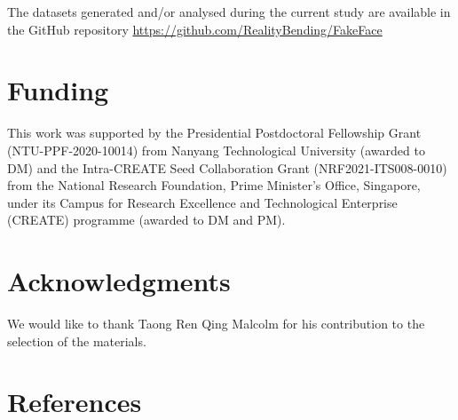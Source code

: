 \documentclass[
  man,floatsintext]{apa6}
\begin{document}
The datasets generated and/or analysed during the current study are available in the GitHub repository \url{https://github.com/RealityBending/FakeFace}

\hypertarget{funding}{%
\section{Funding}\label{funding}}

This work was supported by the Presidential Postdoctoral Fellowship Grant (NTU-PPF-2020-10014) from Nanyang Technological University (awarded to DM) and the Intra-CREATE Seed Collaboration Grant (NRF2021-ITS008-0010) from the National Research Foundation, Prime Minister's Office, Singapore, under its Campus for Research Excellence and Technological Enterprise (CREATE) programme (awarded to DM and PM).

\hypertarget{acknowledgments}{%
\section{Acknowledgments}\label{acknowledgments}}

We would like to thank Taong Ren Qing Malcolm for his contribution to the selection of the materials.

\newpage

\hypertarget{references}{%
\section{References}\label{references}}
\end{document}
